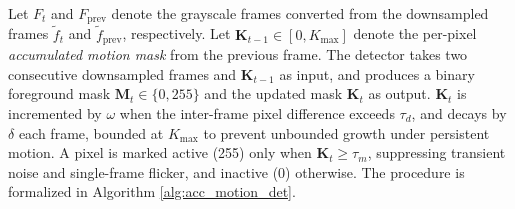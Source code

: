 \documentclass[
  10pt,
]{article}
\begin{document}
Let \(F_t\) and \(F_{\text{prev}}\) denote the grayscale frames
converted from the downsampled frames \(\tilde{f}_t\) and
\(\tilde{f}_{\text{prev}}\), respectively. Let
\(\mathbf{K}_{t-1} \in [0, K_{\max}]\) denote the per-pixel
\textit{accumulated motion mask} from the previous frame. The detector
takes two consecutive downsampled frames and \(\mathbf{K}_{t-1}\) as
input, and produces a binary foreground mask
\(\mathbf{M}_t \in \{0, 255\}\) and the updated mask \(\mathbf{K}_t\) as
output. \(\mathbf{K}_t\) is incremented by \(\omega\) when the
inter-frame pixel difference exceeds \(\tau_d\), and decays by
\(\delta\) each frame, bounded at \(K_{\max}\) to prevent unbounded
growth under persistent motion. A pixel is marked active (255) only when
\(\mathbf{K}_t \geq \tau_m\), suppressing transient noise and
single-frame flicker, and inactive (0) otherwise. The procedure is
formalized in Algorithm \ref{alg:acc_motion_det}.
\end{document}
